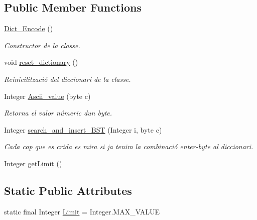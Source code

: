 \subsection*{Public Member Functions}
\begin{DoxyCompactItemize}
\item 
\hyperlink{classdomini_1_1utils_1_1Dict__Encode_aa16372a031311494fdcae13d1a9b48c3}{Dict\+\_\+\+Encode} ()
\begin{DoxyCompactList}\small\item\em Constructor de la classe. \end{DoxyCompactList}\item 
void \hyperlink{classdomini_1_1utils_1_1Dict__Encode_a6c3016286b3bb242d12799f8e7ebb585}{reset\+\_\+dictionary} ()
\begin{DoxyCompactList}\small\item\em Reinicilització del diccionari de la classe. \end{DoxyCompactList}\item 
Integer \hyperlink{classdomini_1_1utils_1_1Dict__Encode_a12e23ecdd9b0078cb6e56c01126248b9}{Ascii\+\_\+value} (byte c)
\begin{DoxyCompactList}\small\item\em Retorna el valor númeric d\textquotesingle{}un byte. \end{DoxyCompactList}\item 
Integer \hyperlink{classdomini_1_1utils_1_1Dict__Encode_a1bafdca1835da3fa93b900ff0aa720e0}{search\+\_\+and\+\_\+insert\+\_\+\+B\+ST} (Integer i, byte c)
\begin{DoxyCompactList}\small\item\em Cada cop que es crida es mira si ja tenim la combinació enter-\/byte al diccionari. \end{DoxyCompactList}\item 
Integer \hyperlink{classdomini_1_1utils_1_1Dict__Encode_a21a05b62b848a7ab9fbdf49a3a6e7edf}{get\+Limit} ()
\end{DoxyCompactItemize}
\subsection*{Static Public Attributes}
\begin{DoxyCompactItemize}
\item 
static final Integer \hyperlink{classdomini_1_1utils_1_1Dict__Encode_a48fe9a878056a119ad36a0aad2727a13}{Limit} = Integer.\+M\+A\+X\+\_\+\+V\+A\+L\+UE
\end{DoxyCompactItemize}
